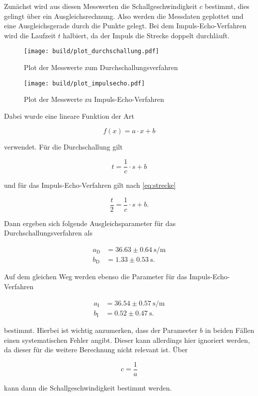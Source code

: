 Zunächst wird aus diesen Messwerten die Schallgeschwindigkeit $c$ bestimmt, dies gelingt über ein Ausgleichsrechnung.
Also werden die Messdaten geplottet und eine Ausgleichsgerade durch die Punkte gelegt.
Bei dem Impuls-Echo-Verfahren wird die Laufzeit $t$ halbiert, da der Impuls die Strecke doppelt durchläuft.

\begin{figure}
    \centering
    \texttt{[image: build/plot\_durchschallung.pdf]}
    \caption{Plot der Messwerte zum Durchschallungsverfahren}
    \label{fig:durch}
\end{figure}

\begin{figure}
    \centering
    \texttt{[image: build/plot\_impulsecho.pdf]}
    \caption{Plot der Messwerte zu Impuls-Echo-Verfahren}
    \label{fig:impuls}
\end{figure}

Dabei wurde eine lineare Funktion der Art 

\begin{equation}
    f(x) = a \cdot x + b 
\end{equation}

verwendet.
Für die Durchschallung gilt

\begin{equation}
    t = \frac{1}{c} \cdot s + b 
\end{equation}

und für das Impuls-Echo-Verfahren gilt nach \eqref{eq:strecke}

\begin{equation}
    \frac{t}{2} = \frac{1}{c} \cdot s + b.
\end{equation}

Dann ergeben sich folgende Ausgleichsparameter für das Durchschallungsverfahren als

\begin{align}
    a_\text{D} &= 36.63 \pm \SI{0.64}{\second\per\meter}\\
    b_\text{D} &= 1.33 \pm \SI{0.53}{\second}.
\end{align}

Auf dem gleichen Weg werden ebenso die Parameter für das Impuls-Echo-Verfahren 

\begin{align}
    a_\text{I} &= 36.54 \pm \SI{0.57}{\second\per\meter}\\
    b_\text{I} &= 0.52 \pm \SI{0.47}{\second}.
\end{align}

bestimmt.
Hierbei ist wichtig anzumerken, dass der Parameeter $b$ in beiden Fällen einen systematischen Fehler angibt.
Dieser kann allerdings hier ignoriert werden, da dieser für die weitere Berechnung nicht relevant ist.
Über 

\begin{equation}
    c = \frac{1}{a}
\end{equation}

kann dann die Schallgeschwindigkeit bestimmt werden.